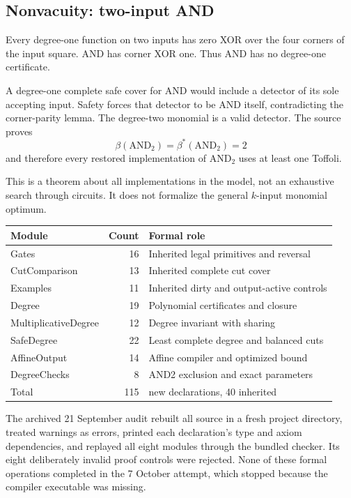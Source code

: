 \subsection*{Nonvacuity: two-input AND}
Every degree-one function on two inputs has zero XOR over the four corners of the input square. AND has corner XOR one. Thus AND has no degree-one certificate.

A degree-one complete safe cover for AND would include a detector of its sole accepting input. Safety forces that detector to be AND itself, contradicting the corner-parity lemma. The degree-two monomial is a valid detector. The source proves
\[
\beta(\mathrm{AND}_2)=\beta^*(\mathrm{AND}_2)=2
\]
and therefore every restored implementation of AND$_2$ uses at least one Toffoli.

This is a theorem about all implementations in the model, not an exhaustive search through circuits. It does not formalize the general $k$-input monomial optimum.

\begin{tabularx}{\linewidth}{@{}>{\raggedright\arraybackslash}p{1.9in}r>{\raggedright\arraybackslash}X@{}}\toprule
Module & Count & Formal role\\\midrule
Gates & 16 & Inherited legal primitives and reversal\\
CutComparison & 13 & Inherited complete cut cover\\
Examples & 11 & Inherited dirty and output-active controls\\
Degree & 19 & Polynomial certificates and closure\\
MultiplicativeDegree & 12 & Degree invariant with sharing\\
SafeDegree & 22 & Least complete degree and balanced cuts\\
AffineOutput & 14 & Affine compiler and optimized bound\\
DegreeChecks & 8 & AND2 exclusion and exact parameters\\\midrule
Total & 115 & 75 new declarations, 40 inherited\\\bottomrule
\end{tabularx}

The archived 21 September audit rebuilt all source in a fresh project directory, treated warnings as errors, printed each declaration's type and axiom dependencies, and replayed all eight modules through the bundled checker. Its eight deliberately invalid proof controls were rejected. None of these formal operations completed in the 7 October attempt, which stopped because the compiler executable was missing.

